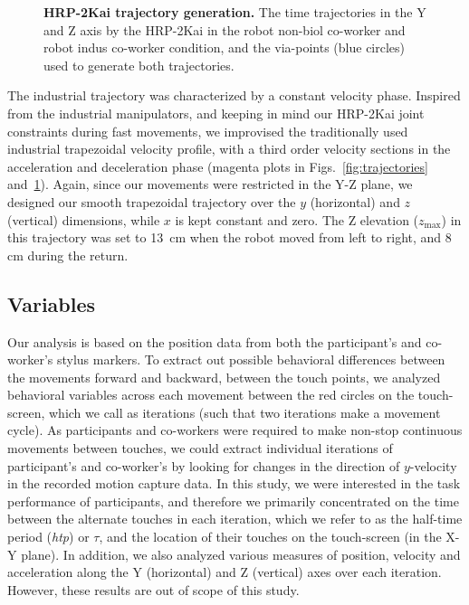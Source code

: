 \documentclass[a4paper, 12pt, oneside]{Thesis}  %
\begin{document}
\begin{figure}[hpt]
	\caption{{\bf HRP-2Kai trajectory generation.} The time trajectories in the Y and Z axis by the HRP-2Kai in the robot non-biol co-worker and robot indus co-worker condition, and the via-points (blue circles) used to generate both trajectories.}
	\label{fig:trajectories2}
\end{figure}


The industrial trajectory was characterized by a constant velocity phase. Inspired from the industrial manipulators, and keeping in mind our HRP-2Kai joint constraints during fast movements, we improvised the traditionally used industrial trapezoidal velocity profile, with a third order velocity sections in the acceleration and deceleration phase (magenta plots in Figs.~\ref{fig:trajectories} and~\ref{fig:trajectories2}). Again, since our movements were restricted in the Y-Z plane, we designed our smooth trapezoidal trajectory over the $y$ (horizontal) and $z$ (vertical) dimensions, while $x$ is kept constant and zero. The Z elevation ($z_{\max}$) in this trajectory was set to 13~cm when the robot moved from left to right, and 8 cm during the return.


\subsection{Variables}

Our analysis is based on the position data from both the participant's and co-worker's stylus markers. To extract out possible behavioral differences between the movements forward and backward, between the touch points, we analyzed behavioral variables across each movement between the red circles on the touch-screen, which we call as iterations (such that two iterations make a movement cycle). As participants and co-workers were required to make non-stop continuous movements between touches, we could extract individual iterations of participant's and co-worker's by looking for changes in the direction of $y$-velocity in the recorded motion capture data. In this study, we were interested in the task performance of participants, and therefore we primarily concentrated on the time between the alternate touches in each iteration, which we refer to as the half-time period ({\it htp}) or $\tau$, and the location of their touches on the touch-screen (in the X-Y plane). In addition, we also analyzed various measures of position, velocity and acceleration along the Y (horizontal) and Z (vertical) axes over each iteration. However, these results are out of scope of this study.
\end{document}
